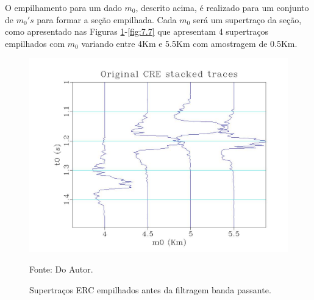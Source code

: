 
O empilhamento para um dado $m_0$, descrito acima, é realizado para um conjunto de $m_0's$ para formar a seção empilhada.
Cada $m_0$ será um supertraço da seção, como apresentado nas Figuras \ref{fig:7.6}-\ref{fig:7.7} que apresentam 4 supertraços empilhados
com $m_0$ variando entre 4Km e 5.5Km com amostragem de 0.5Km.

\begin{figure}
\caption{Supertraços ERC empilhados antes da filtragem banda passante.}
\begin{center}
\includegraphics[scale=0.4]{images/stackedTraces.jpeg}
\vspace{-0.3cm}
\end{center}
\begin{center}
 Fonte: Do Autor.
\end{center}
\label{fig:7.6}
\end{figure}

